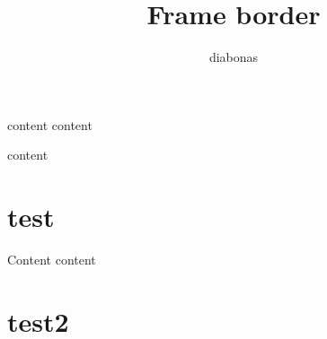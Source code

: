 \documentclass{beamer}
\author{diabonas}
\title{Frame border}
\begin{document}
\begin{frame}{content}
content
\end{frame}
\begin{frame}
content
\end{frame}
\section{test}
\begin{frame}{Content}
content
\end{frame}
\section{test2}
\end{document}
